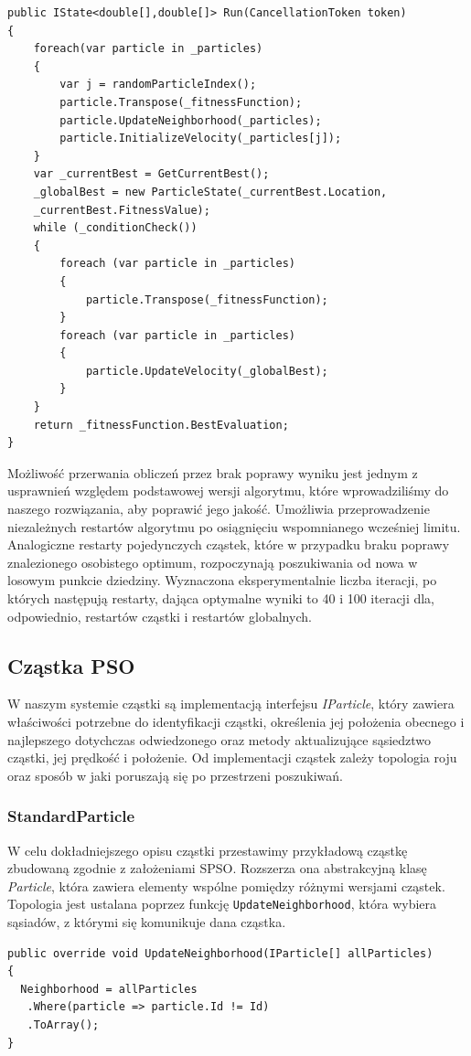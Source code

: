 \documentclass[12pt, twoside, openany, abstract=on]{report}
\theoremstyle{definition}
\begin{document}
\lstset{style=sharpc}
\begin{lstlisting}[frame=single]
public IState<double[],double[]> Run(CancellationToken token)
{
	foreach(var particle in _particles)
	{
		var j = randomParticleIndex();	      
		particle.Transpose(_fitnessFunction);
	    particle.UpdateNeighborhood(_particles);
		particle.InitializeVelocity(_particles[j]);
	}
	var _currentBest = GetCurrentBest();
	_globalBest = new ParticleState(_currentBest.Location,
	_currentBest.FitnessValue);
	while (_conditionCheck())
	{
		foreach (var particle in _particles)
		{
	    	particle.Transpose(_fitnessFunction);
	    }
		foreach (var particle in _particles)
	    {
			particle.UpdateVelocity(_globalBest);
		}
	}
	return _fitnessFunction.BestEvaluation;
}
\end{lstlisting}

Możliwość przerwania obliczeń przez brak poprawy wyniku jest jednym z usprawnień względem podstawowej wersji algorytmu, które wprowadziliśmy do naszego rozwiązania, aby poprawić jego jakość. Umożliwia przeprowadzenie niezależnych restartów algorytmu po osiągnięciu wspomnianego wcześniej limitu. Analogiczne restarty pojedynczych cząstek, które w przypadku braku poprawy znalezionego osobistego optimum, rozpoczynają poszukiwania od nowa w losowym punkcie dziedziny. Wyznaczona eksperymentalnie liczba iteracji, po których następują restarty, dająca optymalne wyniki to 40 i 100 iteracji dla, odpowiednio, restartów cząstki i restartów globalnych.

\subsection{Cząstka PSO}
W naszym systemie cząstki są implementacją interfejsu \textit{IParticle}, który zawiera właściwości potrzebne do identyfikacji cząstki, określenia jej położenia obecnego i najlepszego dotychczas odwiedzonego oraz metody   aktualizujące sąsiedztwo cząstki, jej prędkość i położenie. Od implementacji cząstek zależy topologia roju oraz sposób w jaki poruszają się po przestrzeni poszukiwań. 

\subsubsection{StandardParticle}
W celu dokładniejszego opisu cząstki przestawimy przykładową cząstkę zbudowaną zgodnie z założeniami SPSO. %
Rozszerza ona abstrakcyjną klasę \textit{Particle}, która zawiera elementy wspólne pomiędzy różnymi wersjami cząstek. Topologia jest ustalana poprzez funkcję \texttt{UpdateNeighborhood}, która wybiera sąsiadów, z którymi się komunikuje dana cząstka.
\lstset{style=sharpc}
\begin{lstlisting}[frame=single]
public override void UpdateNeighborhood(IParticle[] allParticles)
{
  Neighborhood = allParticles
   .Where(particle => particle.Id != Id)
   .ToArray();
}
\end{lstlisting}
\end{document}
